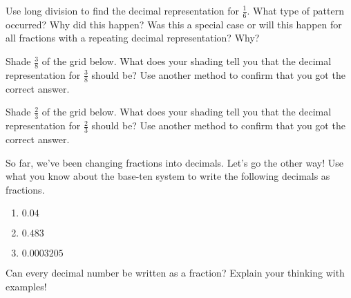 \documentclass[noauthor, nooutcomes]{ximera}
\begin{document}
\begin{problem}
Use long division to find the decimal representation for $\frac{1}{6}$. What type of pattern occurred?  Why did this happen?  Was this a special case or will this happen for all fractions with a repeating decimal representation?  Why?
\end{problem}


\begin{problem}
Shade $\frac{3}{8}$ of the grid below. What does your shading tell you that the decimal representation for $\frac{3}{8}$ should be? Use another method to confirm that you got the correct answer.
\begin{center}
\end{center}
\end{problem}


\begin{problem}
Shade $\frac{2}{3}$ of the grid below. What does your shading tell you that the decimal representation for $\frac{2}{3}$ should be? Use another method to confirm that you got the correct answer.
\begin{center}
\end{center}
\end{problem}



\begin{problem}
So far, we've been changing fractions into decimals. Let's go the other way! Use what you know about the base-ten system to write the following decimals as fractions.
\begin{enumerate}
    \item $0.04$
    \item $0.483$
    \item $0.0003205$
\end{enumerate}
\end{problem}


\begin{problem}
Can every decimal number be written as a fraction? Explain your thinking with examples!
\end{problem}
\end{document}
